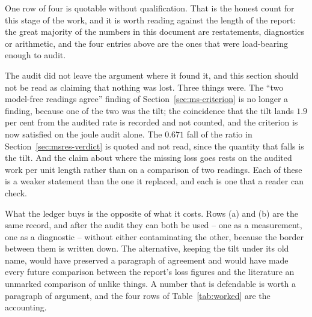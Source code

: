 One row of four is quotable without qualification. That is the honest count for this stage of the work, and it is
worth reading against the length of the report: the great majority of the numbers in this document are
restatements, diagnostics or arithmetic, and the four entries above are the ones that were load-bearing enough
to audit.

The audit did not leave the argument where it found it, and this section should not be read as claiming that
nothing was lost. Three things were. The ``two model-free readings agree'' finding of
Section~\ref{sec:ms-criterion} is no longer a finding, because one of the two was the tilt; the coincidence that
the tilt lands $1.9$ per cent from the audited rate is recorded and not counted, and the criterion is now
satisfied on the joule audit alone. The $0.671$ fall of the ratio in Section~\ref{sec:msres-verdict} is quoted
and not read, since the quantity that falls is the tilt. And the claim about where the missing loss goes rests
on the audited work per unit length rather than on a comparison of two readings. Each of these is a weaker
statement than the one it replaced, and each is one that a reader can check.

What the ledger buys is the opposite of what it costs. Rows (a) and (b) are the same record, and after the audit
they can both be used -- one as a measurement, one as a diagnostic -- without either contaminating the other,
because the border between them is written down. The alternative, keeping the tilt under its old name, would have
preserved a paragraph of agreement and would have made every future comparison between the report's loss figures
and the literature an unmarked comparison of unlike things. A number that is defendable is worth a paragraph of
argument, and the four rows of Table~\ref{tab:worked} are the accounting.
